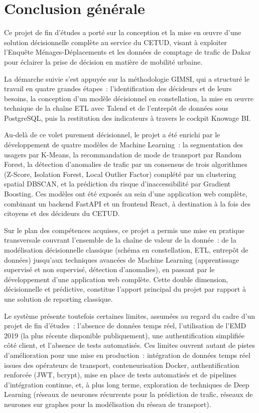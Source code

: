 \chapter*{Conclusion générale}

Ce projet de fin d'études a porté sur la conception et la mise en œuvre d'une solution décisionnelle complète au service du CETUD, visant à exploiter l'Enquête Ménages-Déplacements et les données de comptage de trafic de Dakar pour éclairer la prise de décision en matière de mobilité urbaine.

La démarche suivie s'est appuyée sur la méthodologie GIMSI, qui a structuré le travail en quatre grandes étapes~: l'identification des décideurs et de leurs besoins, la conception d'un modèle décisionnel en constellation, la mise en œuvre technique de la chaîne ETL avec Talend et de l'entrepôt de données sous PostgreSQL, puis la restitution des indicateurs à travers le cockpit Knowage BI.

Au-delà de ce volet purement décisionnel, le projet a été enrichi par le développement de quatre modèles de Machine Learning~: la segmentation des usagers par K-Means, la recommandation de mode de transport par Random Forest, la détection d'anomalies de trafic par un consensus de trois algorithmes (Z-Score, Isolation Forest, Local Outlier Factor) complété par un clustering spatial DBSCAN, et la prédiction du risque d'inaccessibilité par Gradient Boosting. Ces modèles ont été exposés au sein d'une application web complète, combinant un backend FastAPI et un frontend React, à destination à la fois des citoyens et des décideurs du CETUD.

Sur le plan des compétences acquises, ce projet a permis une mise en pratique transversale couvrant l'ensemble de la chaîne de valeur de la donnée~: de la modélisation décisionnelle classique (schéma en constellation, ETL, entrepôt de données) jusqu'aux techniques avancées de Machine Learning (apprentissage supervisé et non supervisé, détection d'anomalies), en passant par le développement d'une application web complète. Cette double dimension, décisionnelle et prédictive, constitue l'apport principal du projet par rapport à une solution de reporting classique.

Le système présente toutefois certaines limites, assumées au regard du cadre d'un projet de fin d'études~: l'absence de données temps réel, l'utilisation de l'EMD 2019 (la plus récente disponible publiquement), une authentification simplifiée côté client, et l'absence de tests automatisés. Ces limites ouvrent autant de pistes d'amélioration pour une mise en production~: intégration de données temps réel issues des opérateurs de transport, conteneurisation Docker, authentification renforcée (JWT, bcrypt), mise en place de tests automatisés et de pipelines d'intégration continue, et, à plus long terme, exploration de techniques de Deep Learning (réseaux de neurones récurrents pour la prédiction de trafic, réseaux de neurones sur graphes pour la modélisation du réseau de transport).

